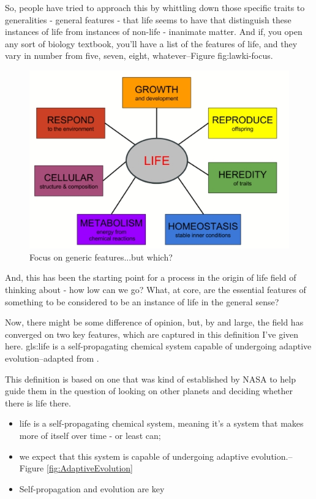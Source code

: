 \documentclass[]{article}
\begin{document}
So, people have tried to approach this by whittling down those specific traits
to generalities - general features - that life seems to have
that distinguish these instances of life from instances of non-life -
inanimate matter. And if, you open any sort
of biology textbook,
you'll have a list
of the features of life,
and they vary in number
from five, seven, eight, whatever--Figure {fig:lawki-focus}.

\begin{figure}[H]
	\caption{Focus on generic features...but which?}\label{fig:lawki-focus} 
	\includegraphics[width=\textwidth]{lawki-focus}
\end{figure}
And, this has been the starting point
for a process in the origin of life field
of thinking about - how low can we go?
What, at core, are the essential features
of something to be considered to be
an instance of life in the general sense?

Now, there might be some
difference of opinion,
but, by and large,
the field has converged
on two key features,
which are captured
in this definition I've given here.
\gls{gls:life} is a self-propagating chemical system capable of undergoing adaptive evolution--adapted from \cite{deamer1994origins}.

This definition is based on one that was kind of established by NASA to help guide them in the question of looking on other planets and deciding whether there is life there.

\begin{itemize}
	\item life is a self-propagating 	chemical system,	meaning it's a system that makes more	of itself over time - or least can;
	\item  we expect 	that this system 	is capable of undergoing
	adaptive evolution.--Figure \ref{fig:AdaptiveEvolution}
	\item Self-propagation and evolution are key
\end{itemize}
\end{document}
